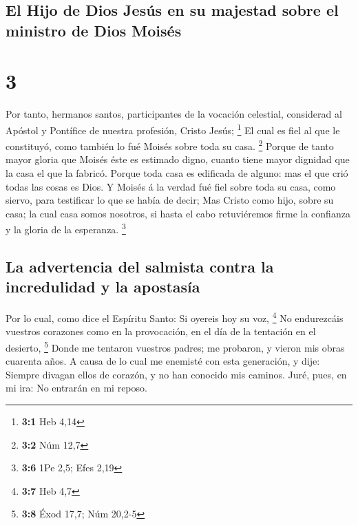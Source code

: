 \hypertarget{el-hijo-de-dios-jesuxfas-en-su-majestad-sobre-el-ministro-de-dios-moisuxe9s}{%
\subsection{El Hijo de Dios Jesús en su majestad sobre el ministro de
Dios
Moisés}\label{el-hijo-de-dios-jesuxfas-en-su-majestad-sobre-el-ministro-de-dios-moisuxe9s}}

\hypertarget{section-2}{%
\section{3}\label{section-2}}

 Por tanto, hermanos santos, participantes de la vocación
celestial, considerad al Apóstol y Pontífice de nuestra profesión,
Cristo Jesús; \footnote{\textbf{3:1} Heb 4,14}  El cual es
fiel al que le constituyó, como también lo fué Moisés sobre toda su
casa. \footnote{\textbf{3:2} Núm 12,7}  Porque de tanto
mayor gloria que Moisés éste es estimado digno, cuanto tiene mayor
dignidad que la casa el que la fabricó.  Porque toda casa es
edificada de alguno: mas el que crió todas las cosas es Dios.
 Y Moisés á la verdad fué fiel sobre toda su casa, como
siervo, para testificar lo que se había de decir;  Mas
Cristo como hijo, sobre su casa; la cual casa somos nosotros, si hasta
el cabo retuviéremos firme la confianza y la gloria de la esperanza.
\footnote{\textbf{3:6} 1Pe 2,5; Efes 2,19}

\hypertarget{la-advertencia-del-salmista-contra-la-incredulidad-y-la-apostasuxeda}{%
\subsection{La advertencia del salmista contra la incredulidad y la
apostasía}\label{la-advertencia-del-salmista-contra-la-incredulidad-y-la-apostasuxeda}}

 Por lo cual, como dice el Espíritu Santo: Si oyereis hoy su
voz, \footnote{\textbf{3:7} Heb 4,7}  No endurezcáis
vuestros corazones como en la provocación, en el día de la tentación en
el desierto, \footnote{\textbf{3:8} Éxod 17,7; Núm 20,2-5} 
Donde me tentaron vuestros padres; me probaron, y vieron mis obras
cuarenta años.  A causa de lo cual me enemisté con esta
generación, y dije: Siempre divagan ellos de corazón, y no han conocido
mis caminos.  Juré, pues, en mi ira: No entrarán en mi
reposo.

